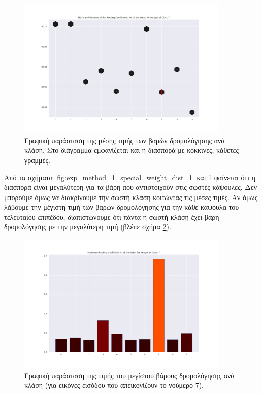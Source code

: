 \begin{figure}[h]
    \centering
    \includegraphics[width=0.9\textwidth]{images/chapter experiments/method 1/image 13/mean_var_for_class_7.png}
    \caption{Γραφική παράσταση της μέσης τιμής των βαρών δρομολόγησης ανά κλάση. Στο διάγραμμα εμφανίζεται και η διασπορά με κόκκινες, κάθετες γραμμές.}
    \label{fig:exp_method_1_special_weight_dist_2}
  \end{figure}

Από τα σχήματα \ref{fig:exp_method_1_special_weight_dist_1} και \ref{fig:exp_method_1_special_weight_dist_2} φαίνεται ότι η διασπορά είναι μεγαλύτερη για τα βάρη που αντιστοιχούν στις σωστές κάψουλες. Δεν μπορούμε όμως να διακρίνουμε την σωστή κλάση κοιτώντας τις μέσες τιμές. Αν όμως λάβουμε την μέγιστη τιμή των βαρών δρομολόγησης για την κάθε κάψουλα του τελευταίου επιπέδου, διαπιστώνουμε ότι πάντα η σωστή κλάση έχει βάρη δρομολόγησης με την μεγαλύτερη τιμή (βλέπε σχήμα \ref{fig:exp_method_1_special_weight_dist_3}).
\begin{figure}[h]
    \centering
    \includegraphics[width=0.9\textwidth]{images/chapter experiments/method 1/image 13/Max_for_class_7.png}
    \caption{Γραφική παράσταση της τιμής του μεγίστου βάρους δρομολόγησης ανά κλάση (για εικόνες εισόδου που απεικονίζουν το νούμερο 7).}
    \label{fig:exp_method_1_special_weight_dist_3}
  \end{figure}

